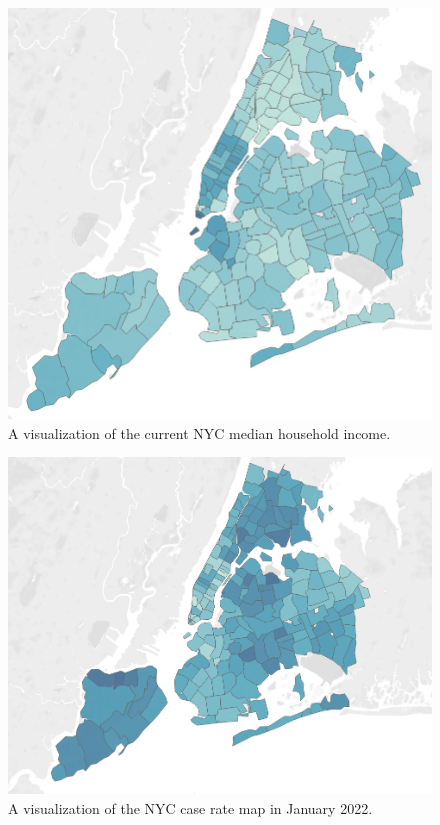 \documentclass{vgtc}                 %
\begin{document}
\begin{figure}[tb]
 \centering %
 \includegraphics[width=\columnwidth]{income-choropleth.png}
 \caption{A visualization of the current NYC median household income.}
 \label{fig:sample}
\end{figure}

\begin{figure}[tb]
 \centering %
 \includegraphics[width=\columnwidth]{Jan22.png}
 \caption{A visualization of the NYC case rate map in January 2022.}
 \label{fig:sample}
\end{figure}
\end{document}
